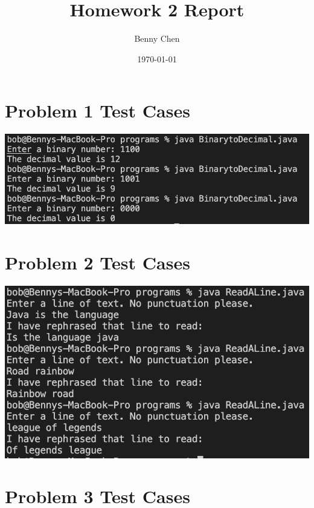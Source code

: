 \documentclass{article}
\title{Homework 2 Report}
\author{Benny Chen}
\date{\today}
\begin{document}
\maketitle

\section{Problem 1 Test Cases}

\begin{center}
    \includegraphics[width=\textwidth]{./images/binarytodecimal}
\end{center}

\section{Problem 2 Test Cases}

\begin{center}
    \includegraphics[width=\textwidth]{./images/readline.png}
\end{center}

\section{Problem 3 Test Cases}
\end{document}
